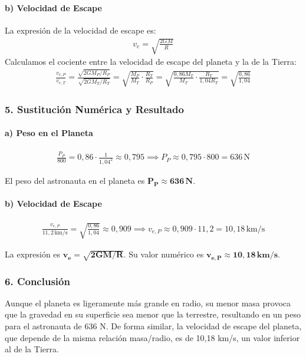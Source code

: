\paragraph{b) Velocidad de Escape}
La expresión de la velocidad de escape es:
\begin{gather}
    v_e = \sqrt{\frac{2GM}{R}}
\end{gather}
Calculamos el cociente entre la velocidad de escape del planeta y la de la Tierra:
\begin{gather}
    \frac{v_{e,P}}{v_{e,T}} = \frac{\sqrt{2GM_P/R_P}}{\sqrt{2GM_T/R_T}} = \sqrt{\frac{M_P}{M_T} \cdot \frac{R_T}{R_P}} = \sqrt{\frac{0,86 M_T}{M_T} \cdot \frac{R_T}{1,04 R_T}} = \sqrt{\frac{0,86}{1,04}}
\end{gather}

\subsubsection*{5. Sustitución Numérica y Resultado}
\paragraph{a) Peso en el Planeta}
\begin{gather}
    \frac{P_P}{800} = 0,86 \cdot \frac{1}{1,04^2} \approx 0,795 \implies P_P \approx 0,795 \cdot 800 = 636\,\text{N}
\end{gather}
\begin{cajaresultado}
    El peso del astronauta en el planeta es $\boldsymbol{P_P \approx 636\,\textbf{N}}$.
\end{cajaresultado}
\paragraph{b) Velocidad de Escape}
\begin{gather}
    \frac{v_{e,P}}{11,2\,\text{km/s}} = \sqrt{\frac{0,86}{1,04}} \approx 0,909 \implies v_{e,P} \approx 0,909 \cdot 11,2 = 10,18\,\text{km/s}
\end{gather}
\begin{cajaresultado}
    La expresión es $\boldsymbol{v_e = \sqrt{2GM/R}}$. Su valor numérico es $\boldsymbol{v_{e,P} \approx 10,18\,\textbf{km/s}}$.
\end{cajaresultado}

\subsubsection*{6. Conclusión}
\begin{cajaconclusion}
Aunque el planeta es ligeramente más grande en radio, su menor masa provoca que la gravedad en su superficie sea menor que la terrestre, resultando en un peso para el astronauta de 636 N. De forma similar, la velocidad de escape del planeta, que depende de la misma relación masa/radio, es de 10,18 km/s, un valor inferior al de la Tierra.
\end{cajaconclusion}

